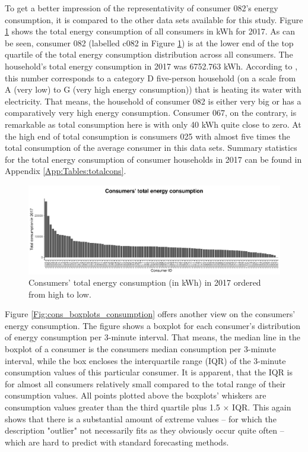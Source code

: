 To get a better impression of the representativity of consumer 082's  energy consumption, it is compared to the other data sets available for this study. Figure \ref{Fig:cons_total_consumption} shows the total energy consumption of all consumers in kWh for 2017. As can be seen, consumer 082 (labelled c082 in Figure \ref{Fig:cons_total_consumption}) is at the lower end of the top quartile of the total energy consumption distribution across all consumers. The household's total energy consumption in 2017 was 6752.763 kWh. According to \citet{Stromspiegel:2017}, this number corresponds to a category D five-person household (on a scale from A (very low) to G (very high energy consumption)) that is heating its water with electricity. That means, the household of consumer 082 is either very big or has a comparatively very high energy consumption. Consumer 067, on the contrary, is remarkable as total consumption here is with only 40 kWh quite close to zero. At the high end of total consumption is consumers 025 with almost five times the total consumption of the average consumer in this data sets. Summary statistics for the total energy consumption of consumer households in 2017 can be found in Appendix \ref{App:Tables:totalcons}.

\begin{figure}[htbp]
 \centering
\includegraphics[width=\textwidth]{thesis/graphs/consumer_totalconsumption2.pdf}
\caption[Consumers' total energy consumption (in kWh) in 2017 ordered from high to low]{Consumers' total energy consumption (in kWh) in 2017 ordered from high to low. \quantnet}
\label{Fig:cons_total_consumption}
\end{figure}

Figure \ref{Fig:cons_boxplots_consumption} offers another view on the consumers' energy consumption. The figure shows a boxplot for each consumer's distribution of energy consumption per 3-minute interval. That means, the median line in the boxplot of a consumer is the consumers median consumption per 3-minute interval, while the box encloses the interquartile range (IQR) of the 3-minute consumption values of this particular consumer. It is apparent, that the IQR is for almost all consumers relatively small compared to the total range of their consumption values. All points plotted above the boxplots' whiskers are consumption values greater than the third quartile plus 1.5 $\times$ IQR. This again shows that there is a substantial amount of extreme values -- for which the description "outlier" not necessarily fits as they obviously occur quite often -- which are hard to predict with standard forecasting methods.

